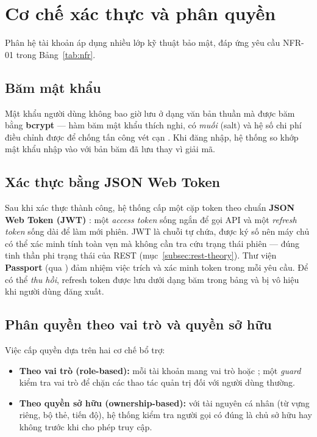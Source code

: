 \section{Cơ chế xác thực và phân quyền}
\label{sec:xac-thuc-phan-quyen}

Phân hệ tài khoản áp dụng nhiều lớp kỹ thuật bảo mật, đáp ứng yêu cầu
NFR-01 trong Bảng~\ref{tab:nfr}.

\subsection{Băm mật khẩu}
\label{subsec:bcrypt}

Mật khẩu người dùng không bao giờ lưu ở dạng văn bản thuần mà được băm bằng
\textbf{bcrypt} --- hàm băm mật khẩu thích nghi, có \textit{muối} (salt) và
hệ số chi phí điều chỉnh được để chống tấn công vét cạn
\cite{provos1999bcrypt}. Khi đăng nhập, hệ thống so khớp mật khẩu nhập vào
với bản băm đã lưu thay vì giải mã.

\subsection{Xác thực bằng JSON Web Token}
\label{subsec:jwt}

Sau khi xác thực thành công, hệ thống cấp một cặp token theo chuẩn
\textbf{JSON Web Token (JWT)} \cite{rfc7519}: một \textit{access token} sống
ngắn để gọi API và một \textit{refresh token} sống dài để làm mới phiên.
JWT là chuỗi tự chứa, được ký số nên máy chủ có thể xác minh tính toàn vẹn
mà không cần tra cứu trạng thái phiên --- đúng tinh thần phi trạng thái của
REST (mục~\ref{subsec:rest-theory}). Thư viện \textbf{Passport} (qua
) đảm nhiệm việc trích và xác minh token trong mỗi yêu
cầu. Để có thể \textit{thu hồi}, refresh token được lưu dưới dạng băm trong
bảng  và bị vô hiệu khi người dùng đăng xuất.

\subsection{Phân quyền theo vai trò và quyền sở hữu}
\label{subsec:rbac}

Việc cấp quyền dựa trên hai cơ chế bổ trợ:

\begin{itemize}
  \item \textbf{Theo vai trò (role-based):} mỗi tài khoản mang vai trò
         hoặc ; một \textit{guard} kiểm tra vai trò
        để chặn các thao tác quản trị đối với người dùng thường.
  \item \textbf{Theo quyền sở hữu (ownership-based):} với tài nguyên cá
        nhân (từ vựng riêng, bộ thẻ, tiến độ), hệ thống kiểm tra người gọi
        có đúng là chủ sở hữu hay không trước khi cho phép truy cập.
\end{itemize}

